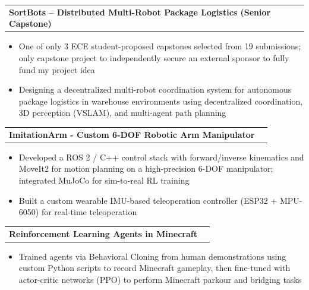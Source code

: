 \documentclass[letterpaper,11pt]{article}
\makeatletter
\newcommand{\resumeItem}[1]{
    \item\small{#1\vspace{-2pt}}
  }
\newcommand{\resumeProjectHeading}[2]{
    \item
    \begin{tabular*}{0.97\textwidth}{l@{\extracolsep{\fill}}r}
      \small#1 & #2 \\
    \end{tabular*}\vspace{-7pt}
  }
\newcommand{\resumeItemListStart}{\begin{itemize}}
\newcommand{\resumeItemListEnd}{\end{itemize}\vspace{-5pt}}
\makeatother
\begin{document}
  \resumeProjectHeading{\textbf{SortBots -- Distributed Multi-Robot Package Logistics (Senior Capstone)}}{}
    \resumeItemListStart
        \resumeItem{One of only 3 ECE student-proposed capstones selected from 19 submissions; only capstone project to independently secure an external sponsor to fully fund my project idea}
      \resumeItem{Designing a decentralized multi-robot coordination system for autonomous 
        package logistics in warehouse environments using decentralized coordination, 3D perception (VSLAM), and multi-agent path planning}
    \resumeItemListEnd

  \resumeProjectHeading{\textbf{ImitationArm - Custom 6-DOF Robotic Arm Manipulator}}{}
  \resumeItemListStart
    \resumeItem{Developed a ROS 2 / C++ control stack with forward/inverse kinematics and MoveIt2 for motion planning on a high-precision 6-DOF manipulator; integrated MuJoCo for sim-to-real RL training}
    \resumeItem{Built a custom wearable IMU-based teleoperation controller (ESP32 + MPU-6050) for real-time teleoperation}
  \resumeItemListEnd

  \resumeProjectHeading{\textbf{Reinforcement Learning Agents in Minecraft}}{}
  \resumeItemListStart
    \resumeItem{Trained agents via Behavioral Cloning from human demonstrations using custom Python scripts to record Minecraft gameplay, then fine-tuned with actor-critic networks (PPO) to perform
  Minecraft parkour and bridging tasks}
  \resumeItemListEnd



\end{document}

